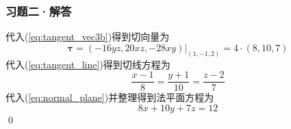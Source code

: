 \begin{frame}
    \frametitle{习题二·解答}

    代入(\ref{eq:tangent_vec3b})得到切向量为
    $$\boldsymbol{\tau}=\left.(-16yz,20xz,-28xy)\right|_{(1,-1,2)}=4\cdot(8,10,7)$$\pause
    代入(\ref{eq:tangent_line})得到切线方程为
    $$\frac{x-1}{8}=\frac{y+1}{10}=\frac{z-2}{7}$$\pause
    代入(\ref{eq:normal_plane})并整理得到法平面方程为
    $$8x+10y+7z=12$$
    \qed

\end{frame}